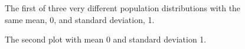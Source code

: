 \documentclass[
  letterpaper,
  DIV=11,
  numbers=noendperiod]{scrreprt}
\begin{document}
\begin{figure}


\caption{\label{fig-hist53}The first of three very different population
distributions with the same mean, 0, and standard deviation, 1.}

\end{figure}%

\begin{figure}


\caption{\label{fig-hist54}The second plot with mean 0 and standard
deviation 1.}

\end{figure}%
\end{document}
